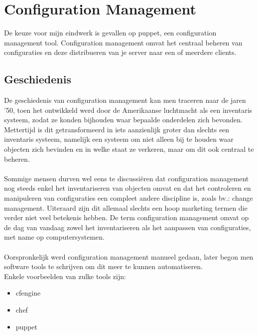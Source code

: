 \chapter{Configuration Management}

De keuze voor mijn eindwerk is gevallen op puppet, een configuration management tool. Configuration management omvat het centraal beheren van configuraties en deze distribueren van je server naar een of meerdere clients.


\section{Geschiedenis}

De geschiedenis van configuration management kan men traceren naar de jaren '50, toen het ontwikkeld werd door de Amerikaanse luchtmacht als een inventaris systeem, zodat ze konden bijhouden waar bepaalde onderdelen zich bevonden. Mettertijd is dit getransformeerd in iets aanzienlijk groter dan slechts een inventaris systeem, namelijk een systeem om niet alleen bij te houden waar objecten zich bevinden en in welke staat ze verkeren, maar om dit ook centraal te beheren.\\\\
Sommige mensen durven wel eens te discussi\"{e}ren dat configuration management nog steeds enkel het inventariseren van objecten omvat en dat het controleren en manipuleren van configuraties een compleet andere discipline is, zoals bv.: change management. Uiteraard zijn dit allemaal slechts een hoop marketing termen die verder niet veel betekenis hebben. De term configuration management omvat op de dag van vandaag zowel het inventariseren als het aanpassen van configuraties, met name op computersystemen.\\\\
Oorspronkelijk werd configuration management manueel gedaan, later begon men software tools te schrijven om dit meer te kunnen automatiseren.\\
Enkele voorbeelden van zulke tools zijn:
\begin{itemize}
\item cfengine
\item chef
\item puppet
\end{itemize}
